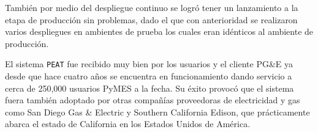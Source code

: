 También por medio del despliegue continuo se logró tener un lanzamiento a la etapa
de producción sin problemas, dado el que con anterioridad se realizaron varios
despliegues en ambientes de prueba los cuales eran idénticos al ambiente de
producción.

\pagebreak

El sistema \texttt{PEAT} fue recibido muy bien por los usuarios y el cliente PG\&E
ya desde que hace cuatro años se encuentra en funcionamiento dando servicio a cerca
de 250,000 usuarios PyMES a la fecha\cite{30_pge_annual_report}. Su éxito provocó que
el sistema fuera también adoptado por otras compañías proveedoras de electricidad y
gas como San Diego Gas \& Electric\cite{32_reuters_c3} y Southern California Edison,
que prácticamente abarca el estado de California en los Estados Unidos de
América\cite{31_energy_map}.
